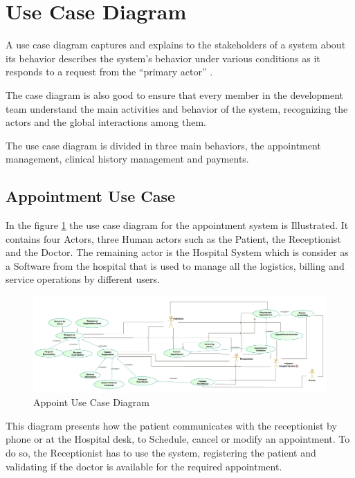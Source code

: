 \documentclass{article}
\begin{document}
            \newpage         
            \section{Use Case Diagram}

            A use case diagram captures and explains to the stakeholders of a system about its behavior describes the
            system’s behavior under various conditions as it responds to a request from the “primary actor”
            \cite{sysml}.

            The case diagram is also good to ensure that every member in the development team understand the main activities and behavior of the system,
            recognizing the actors and the global interactions among them.

            The use case diagram is divided in three main behaviors, the appointment management, clinical history management and payments.

            \subsection{Appointment Use Case}

            In the figure \ref{fig:Appointment} the use case diagram for the appointment system is Illustrated. It contains four Actors, three Human actors such as the Patient, the Receptionist and the Doctor. 
            The remaining actor is the Hospital System which is consider as a Software from the hospital that is used to manage all the logistics, billing and service operations by different users.

            \begin{figure}[H]
                \centering 
                \includegraphics[width=1\linewidth]{./img/appointments.png}
                \caption{Appoint Use Case Diagram}
                \label{fig:Appointment}
            \end{figure}


            This diagram presents how the patient communicates with the receptionist by phone or at the Hospital desk, to Schedule, cancel or modify an appointment. To do so, the Receptionist has to use the
            system, registering the patient and validating if the doctor is available for the required appointment.
\end{document}
